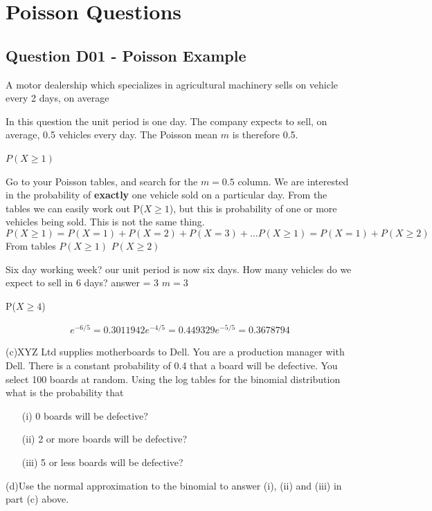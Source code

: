 {\section{Poisson Questions}








\subsection{Question D01  - Poisson Example}
A motor dealership which specializes in agricultural machinery sells on vehicle every 2 days, on average

In this question the unit period is one day. The company expects to sell, on average, 0.5 vehicles every day.
The Poisson mean $m$ is therefore 0.5.

$P(X \geq 1)$

Go to your Poisson tables, and search for the $m=0.5$ column.
We are interested in the probability of \textbf{exactly} one vehicle sold on a particular day.
From the tables we can easily work out P($X \geq 1$), but this is probability of one or more vehicles being sold.
This is not the same thing.
\[P(X \geq 1) = P(X =1) + P( X=2) + P(X=3) + \ldots
P(X \geq 1) = P(X=1) + P(X \geq 2)\]
From tables
$P(X \geq 1)$
$P(X \geq 2)$

Six day working week?
our unit period is now six days.
How many vehicles do we expect to sell in 6 days?
answer = 3
$m=3$

P($X\geq 4$)

\begin{eqnarray}
e^{-6/5} = 0.3011942
e^{-4/5} = 0.449329
e^{-5/5} = 0.3678794
\end{eqnarray}










(c)XYZ Ltd supplies motherboards to Dell.  You are a production manager with Dell.  There is a constant probability of 0.4 that a board will be defective.  You select 100 boards at random.  Using the log tables for the binomial distribution what is the probability that

\begin{itemize}
\item[(i)] 0 boards will be defective?
\item[(ii)] 2 or more boards will be defective?
\item[(iii)]5 or less boards will be defective?
\end{itemize}
(d)Use the normal approximation to the binomial to answer (i), (ii) and (iii) in part (c) above.

}
